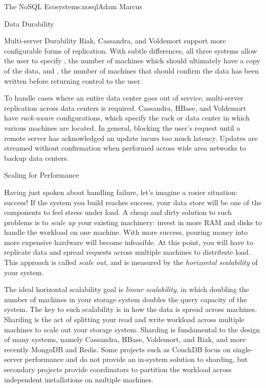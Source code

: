 \begin{aosachapter}{The NoSQL Ecosystem}{s:nosql}{Adam Marcus}
\begin{aosasect1}{Data Durability}
\begin{aosasect2}{Multi-server Durability}
Riak, Cassandra, and Voldemort support more configurable forms of
replication.  With subtle differences, all three systems allow the
user to specify , the number of machines which should
ultimately have a copy of the data, and ,
the number of machines that should confirm the data has been written
before returning control to the user.

To handle cases where an entire data center goes out of service,
multi-server replication across data centers is required.  Cassandra,
HBase, and Voldemort have \emph{rack-aware} configurations, which
specify the rack or data center in which various machines are located.
In general, blocking the user's request until a remote server has
acknowledged an update incurs too much latency. Updates are streamed
without confirmation when performed across wide area networks to
backup data centers.

\end{aosasect2}

\end{aosasect1}

\begin{aosasect1}{Scaling for Performance}

Having just spoken about handling failure, let's imagine a rosier
situation: success!  If the system you build reaches success, your
data store will be one of the components to feel stress under load.  A
cheap and dirty solution to such problems is to \emph{scale up} your
existing machinery: invest in more RAM and disks to handle the
workload on one machine.  With more success, pouring money into more
expensive hardware will become infeasible.  At this point, you will
have to replicate data and spread requests across multiple machines to
distribute load.  This approach is called \emph{scale out}, and is
measured by the \emph{horizontal scalability} of your system.

The ideal horizontal scalability goal is \emph{linear scalability}, in
which doubling the number of machines in your storage system doubles
the query capacity of the system.  The key to such scalability is in
how the data is spread across machines.  Sharding is the act of
splitting your read and write workload across multiple machines to
scale out your storage system.  Sharding is fundamental to the design
of many systems, namely Cassandra, HBase, Voldemort, and Riak, and
more recently MongoDB and Redis.  Some projects such as CouchDB focus
on single-server performance and do not provide an in-system solution
to sharding, but secondary projects provide coordinators to partition
the workload across independent installations on multiple machines.


\end{aosasect1}
\end{aosachapter}
